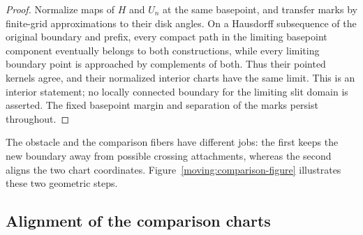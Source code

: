 \begin{proof}
Normalize maps of $H$ and $U_n$ at the same basepoint, and transfer
marks by finite-grid approximations to their disk angles.  On a
Hausdorff subsequence of the original boundary and prefix, every
compact path in the limiting basepoint component eventually belongs
to both constructions, while every limiting boundary point is
approached by complements of both.  Thus their pointed kernels agree,
and their normalized interior charts have the same limit.  This is
an interior statement; no locally connected boundary for the
limiting slit domain is asserted.  The fixed basepoint margin and
separation of the marks persist throughout.
\end{proof}

The obstacle and the comparison fibers have different jobs: the first
keeps the new boundary away from possible crossing attachments, whereas
the second aligns the two chart coordinates.  Figure~\ref{moving:comparison-figure}
illustrates these two geometric steps.



\subsection{Alignment of the comparison charts}

